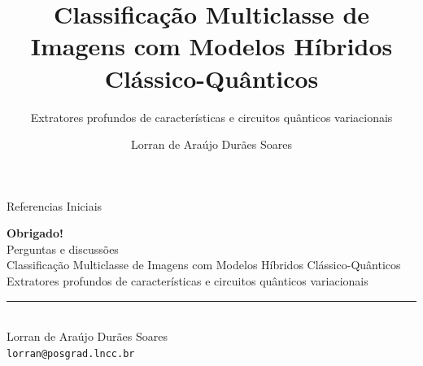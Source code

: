 \documentclass[9pt]{beamer}
\title{Classificação Multiclasse de Imagens com Modelos Híbridos Clássico-Quânticos}
\subtitle{Extratores profundos de características e circuitos quânticos variacionais}
\author[Lorran de Araujo]{Lorran de Araújo Durães Soares}
\institute[]{\normalsize
  \inst{1} Laboratório Nacional de Computação Científica (LNCC/MCTI)\\ 
}
\begin{document}
\maketitle



\begin{frame}[allowframebreaks]{Referencias Iniciais}
    
\end{frame}

\begin{frame}[plain]
    \vfill
    \begin{center}
        {\color{LNCCaltblue}\Huge\bfseries Obrigado!}\\[0.4cm]
        {\Large Perguntas e discussões}\\[0.8cm]
        {\normalsize
        Classificação Multiclasse de Imagens com Modelos Híbridos Clássico-Quânticos\\[0.15cm]
        Extratores profundos de características e circuitos quânticos variacionais
        }

        \vspace{0.3cm}
        {\color{LNCCaltblue}\rule{0.62\linewidth}{0.8pt}}\\[0.35cm]
        {\small Lorran de Araújo Durães Soares\\
        \texttt{lorran@posgrad.lncc.br}}
    \end{center}
    \vfill
\end{frame}
\end{document}
